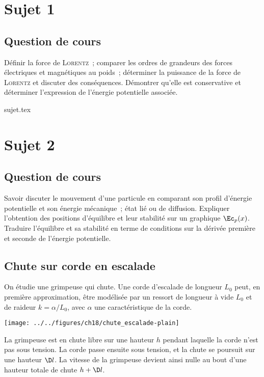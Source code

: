 \documentclass[a4paper, 11pt]{book}
\renewcommand{\a}[0]{\alpha}
\begin{document}
\chapter{Sujet 1}
\section{Question de cours}

Définir la force de \textsc{Lorentz}~; comparer les ordres de grandeurs des
forces électriques et magnétiques au poids~; déterminer la puissance de la force
de \textsc{Lorentz} et discuter des conséquences. Démontrer qu'elle est
conservative et déterminer l'expression de l'énergie potentielle associée.

\resetQ
{sujet.tex}

\chapter{Sujet 2}
\section{Question de cours}

Savoir discuter le mouvement d'une particule en comparant son profil d'énergie
potentielle et son énergie mécanique~; état lié ou de diffusion. Expliquer
l'obtention des positions d'équilibre et leur stabilité sur un graphique
$\Ec_p(x)$. Traduire l'équilibre et sa stabilité en terme de conditions sur la
dérivée première et seconde de l'énergie potentielle.

\resetQ
\section{Chute sur corde en escalade}
On étudie une grimpeuse qui chute. Une corde d'escalade de longueur $L_0$ peut,
en première approximation, être modélisée par un ressort de longueur à vide
$L_0$ et de raideur $k = \a/L_0$, avec $\a$ une caractéristique de la corde.

\begin{center}
    \texttt{[image: ../../figures/ch18/chute\_escalade-plain]}
\end{center}

La grimpeuse est en chute libre sur une hauteur $h$ pendant laquelle la corde
n'est pas sous tension. La corde passe ensuite sous tension, et la chute se
poursuit sur une hauteur $\D l$. La vitesse de la grimpeuse devient ainsi nulle
au bout d'une hauteur totale de chute $h+\D l$.
\end{document}
